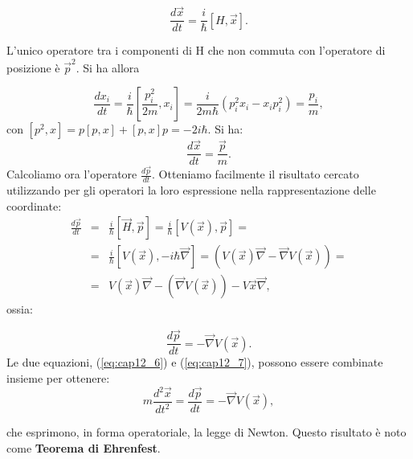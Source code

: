 \begin{equation}
\frac{d\vec{x}}{dt}= \frac{i}{\hbar}[H,\vec{x}].
\end{equation}

L'unico operatore tra i componenti di H che non commuta con l'operatore di posizione è $\vec{p}^2$. Si ha allora 

\begin{equation}
\frac{dx_i}{dt}=\frac{i}{\hbar} \left[ \frac{p_i^2}{2m},x_i \right]=\frac{i}{2m\hbar}(p_i^2x_i-x_ip_i^2)=\frac{p_i}{m},
\end{equation}
con $[p^2,x]=p[p,x]+[p,x]p=-2i\hbar$. Si ha:
\begin{equation}
   	\label{eq:cap12_6}
	\frac{d\vec{x}}{dt}=\frac{\vec{p}}{m}.
\end{equation}
Calcoliamo ora l'operatore $\displaystyle{\frac{d\vec{p}}{dt}}$. Otteniamo facilmente il risultato cercato utilizzando per gli operatori la loro espressione nella rappresentazione delle coordinate:\\
\begin{eqnarray}
	\frac{d\vec{p}}{dt}&=&\frac{i}{\hbar}[\vec{H},\vec{p}]=\frac{i}{\hbar}[V(\vec{x}),\vec{p}]= \nonumber\\
	&=&\frac{i}{\hbar}[V(\vec{x}),-i\hbar\vec{\nabla}]=(V(\vec{x})\vec{\nabla}-\vec{\nabla}V(\vec{x}))= \nonumber \\
	&=&V(\vec{x})\vec{\nabla}-(\vec{\nabla}V(\vec{x}))-V	\vec{x}\vec{\nabla},
\end{eqnarray}
ossia:

\begin{equation}
\label{eq:cap12_7}
\frac{d\vec{p}}{dt}=-\vec{\nabla}V(\vec{x}).
\end{equation}
Le due equazioni, (\ref{eq:cap12_6}) e (\ref{eq:cap12_7}), possono essere combinate insieme per ottenere:\\
\begin{equation}
m\frac{d^2\vec{x}}{dt^2}=\frac{d\vec{p}}{dt}=-\vec{\nabla}V(\vec{x}),
\end{equation}

che esprimono, in forma operatoriale, la legge di Newton. Questo risultato è noto come \textbf{Teorema di Ehrenfest}. 
